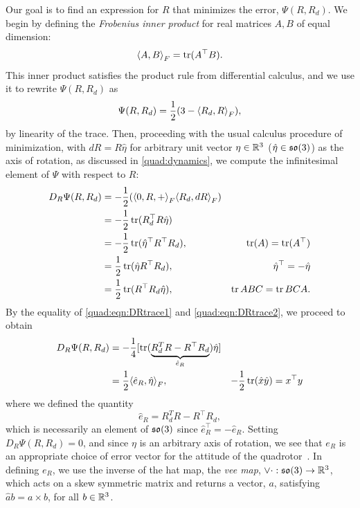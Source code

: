 Our goal is to find an expression for $R$ that minimizes the error, $\Psi(R,R_d)$. We begin by defining the \emph{Frobenius inner product} for real matrices $A,B$ of equal dimension:
\begin{equation}
    {\left\langle {A}, {B} \right\rangle}_F = \operatorname{tr}(A^\top B).
\end{equation}
This inner product satisfies the product rule from differential calculus, and we use it to rewrite $\Psi(R,R_d)$ as
\begin{equation}
    \Psi(R,R_d) = \frac{1}{2}(3 - {\left\langle {R_d}, {R} \right\rangle}_F),
\end{equation}
by linearity of the trace. Then, proceeding with the usual calculus procedure of minimization, with $dR = R\hat{\eta}$ for arbitrary unit vector $\eta \in \mathbb{R}^3$ ($\hat{\eta} \in \mathfrak{so}(3)$) as the axis of rotation, as discussed in \autoref{quad:dynamics}, we compute the infinitesimal element of $\Psi$ with respect to $R$:
\begin{align}
    D_R \Psi(R,R_d) 
        &= -\frac{1}{2}({\left\langle {0, R}, {+} \right\rangle}_F {\left\langle {R_d}, {dR} \right\rangle}_F) \\
        &= -\frac{1}{2}\operatorname{tr}(R_d^\top R\hat{\eta}) \label{quad:eqn:DRtrace1} \\
        &= -\frac{1}{2}\operatorname{tr}(\hat{\eta}^\top R^\top R_d), &\operatorname{tr}(A) = \operatorname{tr}(A^\top)  \\
        &= \frac{1}{2}\operatorname{tr}(\hat{\eta} R^\top R_d), &\hat{\eta}^\top = -\hat{\eta} \\
        &= \frac{1}{2}\operatorname{tr}(R^\top R_d \hat{\eta}), &\operatorname{tr}{ABC} = \operatorname{tr}{BCA}. \label{quad:eqn:DRtrace2}
\end{align}
By the equality of \autoref{quad:eqn:DRtrace1} and \autoref{quad:eqn:DRtrace2}, we proceed to obtain
\begin{align}
    D_R \Psi(R,R_d)
        &= -\frac{1}{4}[\operatorname{tr}(\underbrace{R_d^T R - R^\top R_d}_{\hat{e}_R})\hat{\eta}] \\
        &= \frac{1}{2}{\left\langle {\hat{e}_R}, {\hat{\eta}} \right\rangle}_F, &-\frac{1}{2}\operatorname{tr}(\hat{x}\hat{y}) = x^\top y
\end{align}
where we defined the quantity 
\begin{equation}
    \hat{e}_R = R_d^T R - R^\top R_d,
\end{equation}
which is necessarily an element of $\mathfrak{so}(3)$ since $\hat{e}_R^\top = -\hat{e}_R$. Setting $D_R \Psi(R,R_d) = 0$, and since $\eta$ is an arbitrary axis of rotation, we see that $e_R$ is an appropriate choice of error vector for the attitude of the quadrotor~\cite{Lee2010}. In defining $e_R$, we use the inverse of the hat map, the \emph{vee map}, $\vee{\cdot} : \mathfrak{so}(3) \to \mathbb{R}^3$, which acts on a skew symmetric matrix and returns a vector, $a$, satisfying $\hat{a}b = a \times b$, for all $b \in \mathbb{R}^3$.

